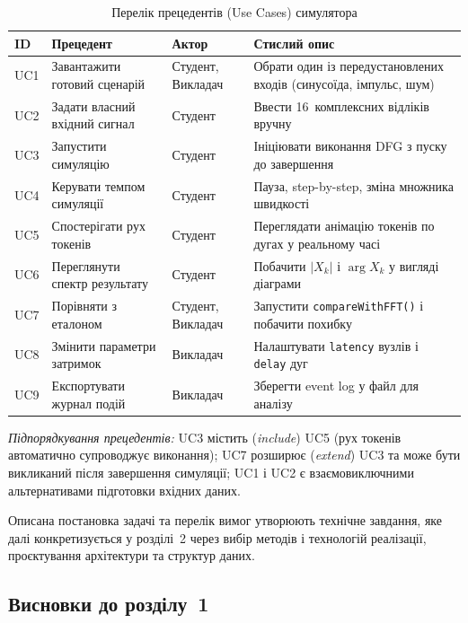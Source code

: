 \begin{table}[H]
  \caption{Перелік прецедентів (Use Cases) симулятора}
  \label{tab:usecases}
  \centering
  \small
  \begin{tabular}{p{1.2cm}p{4.0cm}p{2.0cm}p{6.5cm}}
    \toprule
    ID & Прецедент & Актор & Стислий опис \\
    \midrule
    UC1 & Завантажити готовий сценарій & Студент, Викладач & Обрати один із передустановлених входів (синусоїда, імпульс, шум) \\
    UC2 & Задати власний вхідний сигнал & Студент & Ввести 16~комплексних відліків вручну \\
    UC3 & Запустити симуляцію & Студент & Ініціювати виконання DFG з пуску до завершення \\
    UC4 & Керувати темпом симуляції & Студент & Пауза, step-by-step, зміна множника швидкості \\
    UC5 & Спостерігати рух токенів & Студент & Переглядати анімацію токенів по дугах у реальному часі \\
    UC6 & Переглянути спектр результату & Студент & Побачити $|X_k|$ і $\arg X_k$ у вигляді діаграми \\
    UC7 & Порівняти з еталоном & Студент, Викладач & Запустити \texttt{compareWithFFT()} і побачити похибку \\
    UC8 & Змінити параметри затримок & Викладач & Налаштувати \texttt{latency} вузлів і \texttt{delay} дуг \\
    UC9 & Експортувати журнал подій & Викладач & Зберегти event log у файл для аналізу \\
    \bottomrule
  \end{tabular}
\end{table}

\emph{Підпорядкування прецедентів:} UC3 містить (\textit{include})
UC5 (рух токенів автоматично супроводжує виконання); UC7
розширює (\textit{extend}) UC3 та може бути викликаний після
завершення симуляції; UC1 і UC2 є взаємовиключними альтернативами
підготовки вхідних даних.

Описана постановка задачі та перелік вимог утворюють технічне
завдання, яке далі конкретизується у розділі~2 через вибір методів
і технологій реалізації, проєктування архітектури та структур
даних.


\subsection*{Висновки до розділу~1}

